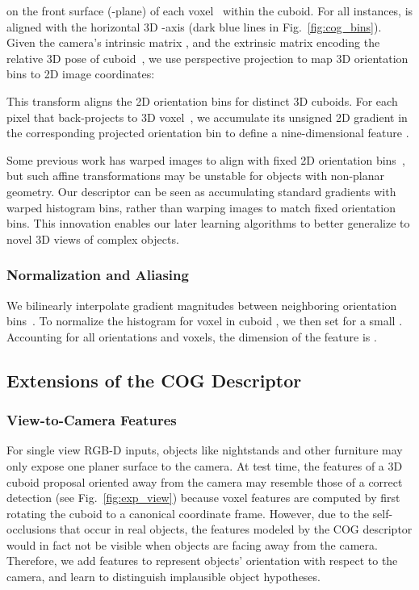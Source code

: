 on the front surface (-plane) of each voxel~ within the cuboid.
For all instances,  is aligned with the horizontal 3D -axis
(dark blue lines in Fig.~\ref{fig:cog_bins}). 
Given the camera's intrinsic matrix , and the extrinsic matrix 
encoding the relative 3D pose of cuboid~,
we use perspective projection to map 3D orientation bins to 2D image coordinates:

This transform aligns the 2D orientation bins for distinct 3D cuboids.
For each pixel that back-projects to 3D voxel~, we accumulate its unsigned 2D gradient in the corresponding projected orientation bin to define a nine-dimensional \cog feature .

Some previous work has warped images to align with fixed 2D orientation 
bins~\cite{hedau2010thinking}, but such affine transformations may be unstable for
objects with non-planar geometry. Our \cog descriptor can be seen as accumulating standard gradients with warped histogram bins, rather than warping images to match fixed orientation bins.  This innovation enables our later learning algorithms to better generalize to novel 3D views of complex objects.



\subsubsection{Normalization and Aliasing}  We bilinearly interpolate gradient magnitudes between neighboring orientation bins~\cite{dalal2005histograms}.  To normalize the histogram  for voxel  in cuboid , we then set  for a small . 
Accounting for all orientations and voxels, the dimension of the \cog feature  is . 


\subsection{Extensions of the COG Descriptor}

\subsubsection{View-to-Camera Features}
For single view RGB-D inputs, objects like nightstands and other furniture may only expose one planer surface to the camera. 
At test time, the features of a 3D cuboid proposal oriented away from the camera may
resemble those of a correct detection (see Fig.~\ref{fig:exp_view})
because voxel features are computed by first rotating the cuboid to a canonical 
coordinate frame. However, due to the self-occlusions that occur in real objects, the features modeled by the COG descriptor would in fact not be visible when objects are facing away from the camera.   
Therefore, we add features to represent 
objects' orientation with respect to the camera, and learn to distinguish implausible object hypotheses.


